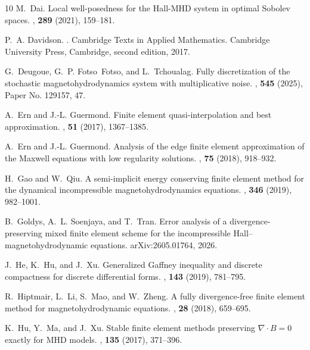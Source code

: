 \documentclass[11pt, reqno]{amsart}
\theoremstyle{definition}
\numberwithin{equation}{section}
\begin{document}
\begin{thebibliography}{10}
	M.~Dai.
	\newblock Local well-posedness for the {H}all-{MHD} system in optimal {S}obolev
	spaces.
	,  {\bf 289} (2021), 159--181.
	
	P.~A. Davidson.
	.
	\newblock Cambridge Texts in Applied Mathematics. Cambridge University Press,
	Cambridge, second edition, 2017.
	
	G.~Deugoue, G.~P. Fotso~Fotso, and L.~Tchoualag.
	\newblock Fully discretization of the stochastic magnetohydrodynamics system
	with multiplicative noise.
	,  {\bf 545} (2025), Paper No. 129157, 47.
	
	A.~Ern and J.-L. Guermond.
	\newblock Finite element quasi-interpolation and best approximation.
	,  {\bf 51} (2017), 1367--1385.
	
	A.~Ern and J.-L. Guermond.
	\newblock Analysis of the edge finite element approximation of the {M}axwell
	equations with low regularity solutions.
	,  {\bf 75} (2018), 918--932.
	
	H.~Gao and W.~Qiu.
	\newblock A semi-implicit energy conserving finite element method for the
	dynamical incompressible magnetohydrodynamics equations.
	,  {\bf 346} (2019),
	982--1001.
	
	B.~Goldys, A.~L. Soenjaya, and T.~Tran.
	\newblock Error analysis of a divergence-preserving mixed finite element scheme
	for the incompressible {H}all--magnetohydrodynamic equations.
	\newblock arXiv:2605.01764, 2026.
	
	J.~He, K.~Hu, and J.~Xu.
	\newblock Generalized {G}affney inequality and discrete compactness for
	discrete differential forms.
	,  {\bf 143} (2019), 781--795.
	
	R.~Hiptmair, L.~Li, S.~Mao, and W.~Zheng.
	\newblock A fully divergence-free finite element method for magnetohydrodynamic
	equations.
	,  {\bf 28} (2018), 659--695.
	
	K.~Hu, Y.~Ma, and J.~Xu.
	\newblock Stable finite element methods preserving {$\nabla\cdot B=0$} exactly
	for {MHD} models.
	,  {\bf 135} (2017), 371--396.
	

\end{thebibliography}
\end{document}
